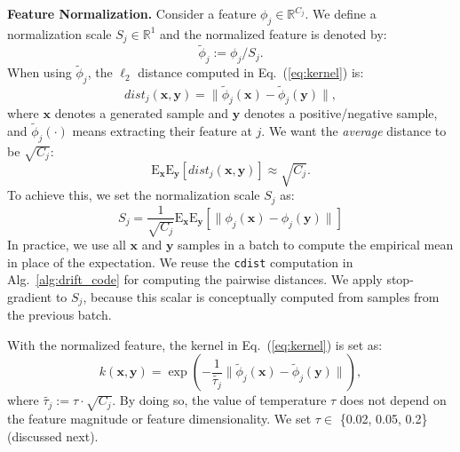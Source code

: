 \documentclass{article}
\newcommand{\vv}[1]{\mathbf{#1}}
\newcommand{\x}{\vv{x}}
\newcommand{\y}{\vv{y}}
\renewcommand{\paragraph}[1]{\vspace{.05em}\noindent\textbf{#1}}
\theoremstyle{plain}
\theoremstyle{definition}
\theoremstyle{remark}
\begin{document}
\paragraph{Feature Normalization.} Consider a feature $\phi_j \in \mathbb{R}^{C_j}$. We define a normalization scale $S_j \in \mathbb{R}^{1}$ and the normalized feature is denoted by:
\begin{equation}
\tilde{\phi}_j := {\phi}_j / S_j.
\end{equation}
When using $\tilde{\phi}_j$, the $\ell_2$ distance computed in Eq.~(\ref{eq:kernel}) is:
\begin{equation}
dist_j(\x, \y) = \|\tilde{\phi}_j(\x) - \tilde{\phi}_j(\y)\|,
\end{equation}
where $\x$ denotes a generated sample and $\y$ denotes a positive/negative sample, and $\tilde{\phi}_j(\cdot)$ means extracting their feature at $j$. We want the \textit{average} distance to be $\sqrt{C_j}$:
\begin{equation}
\mathrm{E}_\x \mathrm{E}_\y [ dist_j(\x, \y)] \approx \sqrt{C_j}.
\end{equation}
To achieve this, we set the normalization scale $S_j$ as:
\begin{equation}
S_j = \frac{1}{\sqrt{C_j}} \mathrm{E}_\x \mathrm{E}_\y [ \|{\phi}_j(\x) - {\phi}_j(\y)\| ]
\end{equation}
In practice, we use all $\x$ and $\y$ samples in a batch to compute the empirical mean in place of the expectation. We reuse the \texttt{cdist} computation in Alg.~\ref{alg:drift_code} for computing the pairwise distances. We apply stop-gradient to $S_j$, because this scalar is conceptually computed from samples from the previous batch.

With the normalized feature, the kernel in Eq.~(\ref{eq:kernel}) is set as:
\begin{equation}
k(\x, \y) = \exp\left(-\frac{1}{\tilde{\tau_j}} \|\tilde{\phi}_j(\x) - \tilde{\phi}_j(\y)\|\right),
\end{equation}
where $\tilde{\tau_j}:=\tau{\cdot}\sqrt{C_j}$. By doing so, the value of temperature $\tau$ does not depend on the feature magnitude or feature dimensionality. We set $\tau \in$ \{0.02, 0.05, 0.2\} (discussed next).
\end{document}
